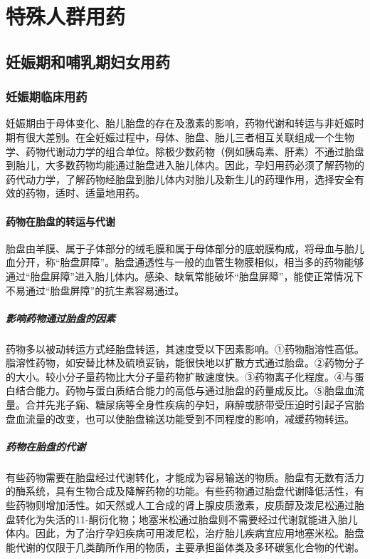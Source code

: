 \chapter{特殊人群用药}

\section{妊娠期和哺乳期妇女用药}

\subsection{妊娠期临床用药}

妊娠期由于母体变化、胎儿胎盘的存在及激素的影响，药物代谢和转运与非妊娠时期有很大差别。在全妊娠过程中，母体、胎盘、胎儿三者相互关联组成一个生物学、药物代谢动力学的组合单位。除极少数药物（例如胰岛素、肝素）不通过胎盘到胎儿，大多数药物均能通过胎盘进入胎儿体内。因此，孕妇用药必须了解药物的药代动力学，了解药物经胎盘到胎儿体内对胎儿及新生儿的药理作用，选择安全有效的药物，适时、适量地用药。

\subsubsection{药物在胎盘的转运与代谢}

胎盘由羊膜、属于子体部分的绒毛膜和属于母体部分的底蜕膜构成，将母血与胎儿血分开，称“胎盘屏障”。胎盘通透性与一般的血管生物膜相似，相当多的药物能够通过“胎盘屏障”进入胎儿体内。感染、缺氧常能破坏“胎盘屏障”，能使正常情况下不易通过“胎盘屏障”的抗生素容易通过。
\paragraph{影响药物通过胎盘的因素}

药物多以被动转运方式经胎盘转运，其速度受以下因素影响。①药物脂溶性高低。脂溶性药物，如安替比林及硫喷妥钠，能很快地以扩散方式通过胎盘。②药物分子的大小。较小分子量药物比大分子量药物扩散速度快。③药物离子化程度。④与蛋白结合能力。药物与蛋白质结合能力的高低与通过胎盘的药量成反比。⑤胎盘血流量。合并先兆子痫、糖尿病等全身性疾病的孕妇，麻醉或脐带受压迫时引起子宫胎盘血流量的改变，也可以使胎盘输送功能受到不同程度的影响，减缓药物转运。
\paragraph{药物在胎盘的代谢}

有些药物需要在胎盘经过代谢转化，才能成为容易输送的物质。胎盘有无数有活力的酶系统，具有生物合成及降解药物的功能。有些药物通过胎盘代谢降低活性，有些药物则增加活性。如天然或人工合成的肾上腺皮质激素，皮质醇及泼尼松通过胎盘转化为失活的11-酮衍化物；地塞米松通过胎盘则不需要经过代谢就能进入胎儿体内。因此，为了治疗孕妇疾病可用泼尼松，治疗胎儿疾病宜应用地塞米松。胎盘能代谢的仅限于几类酶所作用的物质，主要承担甾体类及多环碳氢化合物的代谢。

